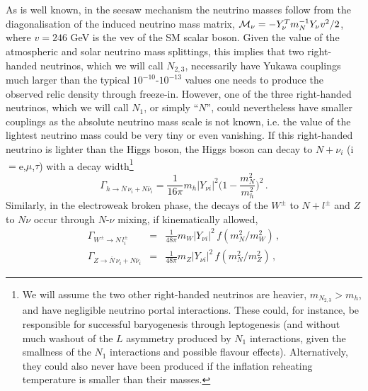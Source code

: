 \documentclass[prd,a4paper,twocolumn,preprintnumbers,nofootinbib,superscriptaddress]{revtex4}
\begin{document}
As is well known, in the seesaw mechanism the neutrino masses follow from the diagonalisation of the induced neutrino mass matrix, ${\cal M}_\nu= - Y_\nu^T m_N^{-1}Y_\nu v^2/2$, where $v=246$ GeV is the vev of the SM scalar boson.
Given the value of the atmospheric and solar neutrino mass splittings, this implies that two right-handed neutrinos, which we will call $N_{2,3}$, necessarily have Yukawa couplings much larger than the typical $10^{-10}$-$10^{-13}$ values one needs to produce the observed relic density through freeze-in. 
However, one of the three right-handed neutrinos, which we will call $N_1$, or simply ``$N$'', could nevertheless have smaller couplings as the absolute neutrino mass scale is not known, i.e. the value of the lightest neutrino mass could be very tiny or even vanishing. 
If this right-handed neutrino is lighter than the Higgs boson, the Higgs boson can decay to $N+\nu_i$ (i$=$e,$\mu$,$\tau$) with a decay width\footnote{We will assume the two other right-handed neutrinos are heavier, $m_{N_{2,3}}> m_h$, and have negligible neutrino portal interactions. These could, for instance, be responsible for successful baryogenesis through leptogenesis (and without much washout of the $L$ asymmetry produced by $N_1$ interactions, given the smallness of the $N_1$ interactions and possible flavour effects). Alternatively, they could also never have been produced if the inflation reheating temperature is smaller than their masses.}
\begin{equation}
	\Gamma_{h\rightarrow \overline{N}\,\nu_i+N\bar{\nu}_i}=\frac{1}{16\pi} m_h |Y_{\nu i}|^2 \Big(  1-\frac{m_{N}^2}{m_h^2}\Big)^2 \,. 
\end{equation}
Similarly, in the electroweak broken phase, the decays of the $W^\pm$ to $N+l^\pm$ and $Z$ to $N \nu$ occur through $N$-$\nu$ mixing, if kinematically allowed, 
\begin{eqnarray}
	\Gamma_{W^\pm \rightarrow N\,l_i^\pm} &=& \frac{1}{48\pi} m_W |Y_{\nu i}|^2\, f(m_{N}^2/m_W^2) \, ,  \\
	\Gamma_{Z \rightarrow \overline{N}\,\nu_i+N \bar{\nu}_i}&=& \frac{1}{48\pi} m_Z |Y_{\nu i}|^2\, f(m_{N}^2/m_Z^2) \,, 
\end{eqnarray}
\end{document}

